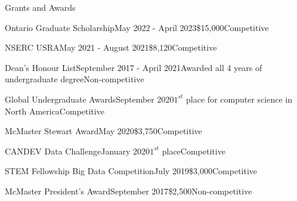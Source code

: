 \begin{rSection}{Grants and Awards} 

\begin{aSubsection}{Ontario Graduate Scholarship}{May 2022 - April 2023}{\$15,000}{Competitive}
\end{aSubsection}

\begin{aSubsection}{NSERC USRA}{May 2021 - August 2021}{\$8,120}{Competitive}
\end{aSubsection}

\begin{aSubsection}{Dean's Honour List}{September 2017 - April 2021}{Awarded all 4 years of undergraduate degree}{Non-competitive}
\end{aSubsection}

\begin{aSubsection}{Global Undergraduate Awards}{September 2020}{$1^{st}$ place for computer science in North America}{Competitive}
\end{aSubsection}

\begin{aSubsection}{McMaster Stewart Award}{May 2020}{\$3,750}{Competitive}
\end{aSubsection}

\begin{aSubsection}{CANDEV Data Challenge}{January 2020}{$1^{st}$ place}{Competitive}
\end{aSubsection}

\begin{aSubsection}{STEM Fellowship Big Data Competition}{July 2019}{\$3,000}{Competitive}
\end{aSubsection}

\begin{aSubsection}{McMaster President's Award}{September 2017}{\$2,500}{Non-competitive}
\end{aSubsection}

\end{rSection}

